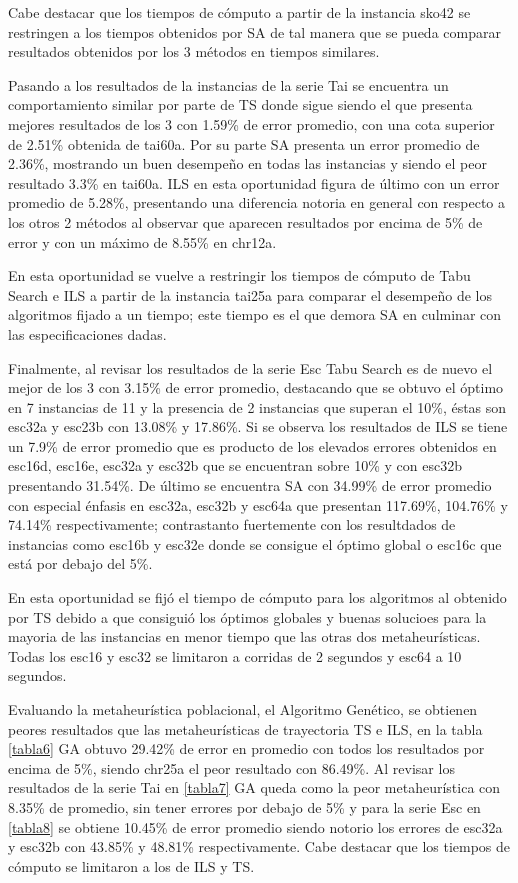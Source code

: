 \documentclass{ci5652}
\begin{document}
Cabe destacar que los tiempos de cómputo a partir de la instancia sko42 se restringen a los tiempos obtenidos por SA de tal manera que se pueda comparar resultados obtenidos por los 3 métodos en tiempos similares. 

Pasando a los resultados de la instancias de la serie Tai se encuentra un comportamiento similar por parte de TS donde sigue siendo el que presenta mejores resultados de los 3 con 1.59\% de error promedio, con una cota superior de 2.51\% obtenida de tai60a. Por su parte SA presenta un error promedio de 2.36\%, mostrando un buen desempeño en todas las instancias y siendo el peor resultado 3.3\% en tai60a. ILS en esta oportunidad figura de último con un error promedio de 5.28\%, presentando una diferencia notoria en general con respecto a los otros 2 métodos al observar que aparecen resultados por encima de 5\% de error y con un máximo de 8.55\% en chr12a.

En esta oportunidad se vuelve a restringir los tiempos de cómputo de Tabu Search e ILS a partir de la instancia tai25a para comparar el desempeño de los algoritmos fijado a un tiempo; este tiempo es el que demora SA en culminar con las especificaciones dadas.

Finalmente, al revisar los resultados de la serie Esc Tabu Search es de nuevo el mejor de los 3 con 3.15\% de error promedio, destacando que se obtuvo el óptimo en 7 instancias de 11 y la presencia de 2 instancias que superan el 10\%, éstas son esc32a y esc23b con 13.08\% y 17.86\%. Si se observa los resultados de ILS se tiene un 7.9\% de error promedio que es producto de los elevados errores obtenidos en esc16d, esc16e, esc32a y esc32b que se encuentran sobre 10\% y con esc32b presentando 31.54\%. De último se encuentra SA con 34.99\% de error promedio con especial énfasis en esc32a, esc32b y esc64a que presentan 117.69\%, 104.76\% y 74.14\% respectivamente; contrastanto fuertemente con los resultdados de instancias como esc16b y esc32e donde se consigue el óptimo global o esc16c que está por debajo del 5\%.

En esta oportunidad se fijó el tiempo de cómputo para los algoritmos al obtenido por TS debido a que consiguió los óptimos globales y buenas solucioes para la mayoria de las instancias en menor tiempo que las otras dos metaheurísticas. Todas los esc16 y esc32 se limitaron a corridas de 2 segundos y esc64 a 10 segundos.

Evaluando la metaheurística poblacional, el Algoritmo Genético, se obtienen peores resultados que las metaheurísticas de trayectoria TS e ILS, en la tabla \ref{tabla6} GA obtuvo 29.42\% de error en promedio con todos los resultados por encima de 5\%, siendo chr25a el peor resultado con 86.49\%. Al revisar los resultados de la serie Tai en \ref{tabla7} GA queda como la peor metaheurística con 8.35\% de promedio, sin tener errores por debajo de 5\% y para la serie Esc en \ref{tabla8} se obtiene 10.45\% de error promedio siendo notorio los errores de esc32a y esc32b con 43.85\% y 48.81\% respectivamente. Cabe destacar que los tiempos de cómputo se limitaron a los de ILS y TS.
\end{document}
